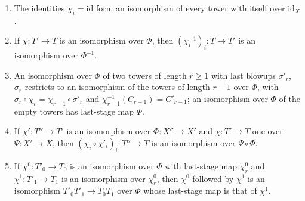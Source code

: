 \begin{lemma}
\label{mc:tower-isomorphism-append}
\leanok
\begin{enumerate}
\item The identities \(\chi_i=\mathrm{id}\) form an isomorphism of every tower with itself over \(\mathrm{id}_X\).
\item If \(\chi\colon T'\to T\) is an isomorphism over \(\Phi\), then \((\chi_i^{-1})_i\colon T\to T'\) is an isomorphism over \(\Phi^{-1}\).
\item An isomorphism over \(\Phi\) of two towers of length \(r\ge1\) with last blowups \(\sigma'_r\), \(\sigma_r\) restricts to an isomorphism of the towers of length
\(r-1\) over \(\Phi\), with \(\sigma_r\circ\chi_r=\chi_{r-1}\circ\sigma'_r\) and \(\chi_{r-1}^{-1}(C_{r-1})=C'_{r-1}\); an isomorphism over \(\Phi\) of the empty towers has
last-stage map \(\Phi\).
\item If \(\chi'\colon T''\to T'\) is an isomorphism over \(\Phi\colon X''\to X'\) and \(\chi\colon T'\to T\) one over \(\Psi\colon X'\to X\), then
\((\chi_i\circ\chi'_i)_i\colon T''\to T\) is an isomorphism over \(\Psi\circ\Phi\).
\item If \(\chi^0\colon T'_0\to T_0\) is an isomorphism over \(\Phi\) with last-stage map \(\chi^0_r\) and \(\chi^1\colon T'_1\to T_1\) is an isomorphism over \(\chi^0_r\), then
\(\chi^0\) followed by \(\chi^1\) is an isomorphism \(T'_0T'_1\to T_0T_1\) over \(\Phi\) whose last-stage map is that of \(\chi^1\).
\end{enumerate}
\end{lemma}
